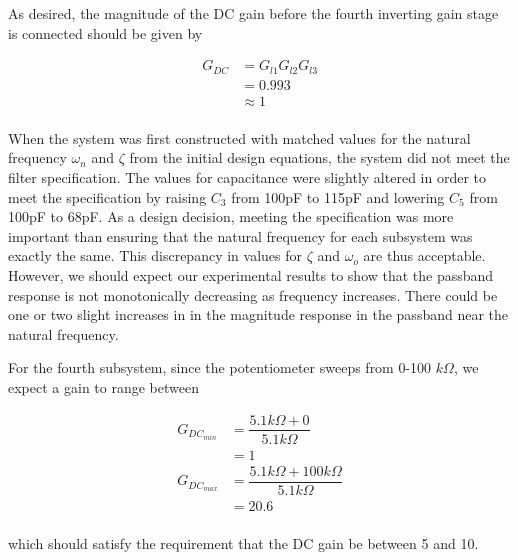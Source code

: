 As desired, the magnitude of the DC gain before the fourth inverting gain stage is connected should be given by

\begin{align*}
G_{DC} &= G_{l1}G_{l2}G_{l3}\\
&=0.993\\
&\approx 1 \\
\end{align*}

When the system was first constructed with matched values for the natural frequency $\omega_n$ and $\zeta$ from the initial design equations, the system did not meet the filter specification. The values for capacitance were slightly altered in order to meet the specification by raising $C_3$ from 100pF to 115pF and lowering $C_5$ from 100pF to 68pF. As a design decision, meeting the specification was more important than ensuring that the natural frequency for each subsystem
was exactly the same. This discrepancy in values for $\zeta$ and $\omega_o$ are thus acceptable. However, we should expect our experimental results to show that the passband response is not monotonically decreasing as frequency increases. There could be one or two slight increases in in the magnitude response in the passband near the natural frequency.

For the fourth subsystem, since the potentiometer sweeps from 0-100 $k\Omega$, we expect a gain to range between

\begin{align*}
G_{DC_{min}} &= \dfrac{5.1k\Omega+0}{5.1k\Omega}\\
&= 1\\
G_{DC_{max}} &= \dfrac{5.1k\Omega+100k\Omega}{5.1k\Omega}\\
&= 20.6 \\
\end{align*}

which should satisfy the requirement that the DC gain be between 5 and 10.
